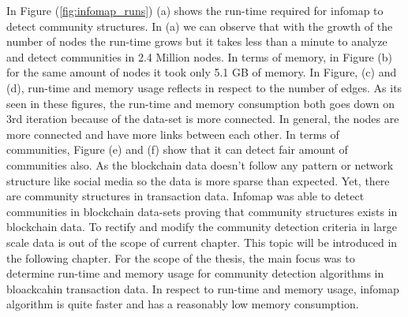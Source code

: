 In Figure (\ref{fig:infomap_runs}) (a) shows the run-time required for infomap to detect community structures. In (a) we can observe that with the growth of the number of nodes the run-time grows but it takes less than a minute to analyze and detect communities in 2.4 Million nodes. In terms of memory, in Figure (b) for the same amount of nodes it took only 5.1 GB of memory. In Figure, (c) and (d), run-time and memory usage reflects in respect to the number of edges. As its seen in these figures, the run-time and memory consumption both goes down on 3rd iteration because of the data-set is more connected. In general, the nodes are more connected and have more links between each other. In terms of communities, Figure (e) and (f) show that it can detect fair amount of communities also. As the blockchain data doesn't follow any pattern or network structure like social media so the data is more sparse than expected. Yet, there are community structures in transaction data. Infomap was able to detect communities in blockchain data-sets proving that community structures exists in blockchain data. To rectify and modify the community detection criteria in large scale data is out of the scope of current chapter. This topic will be introduced in the following chapter. For the scope of the thesis, the main focus was to determine run-time and memory usage for community detection algorithms in bloackcahin transaction data. In respect to run-time and memory usage, infomap algorithm is quite faster and has a reasonably low memory consumption. 
\vfill

